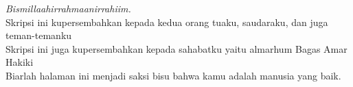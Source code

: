 \vspace{7cm}

\begin{center}
	\textit{Bismillaahirrahmaanirrahiim.} \\
	Skripsi ini kupersembahkan kepada kedua orang tuaku, saudaraku, dan juga teman-temanku \\
	Skripsi ini juga kupersembahkan kepada sahabatku yaitu almarhum Bagas Amar Hakiki \\
	Biarlah halaman ini menjadi saksi bisu bahwa kamu adalah manusia yang baik.
\end{center}
